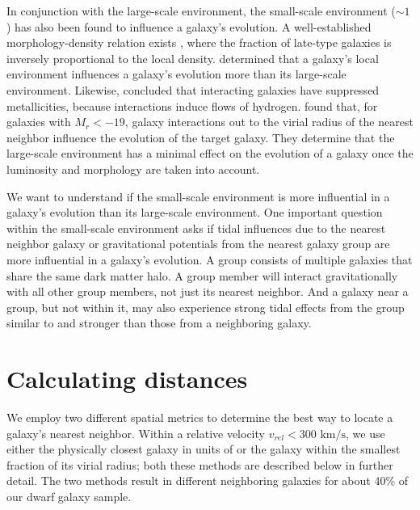In conjunction with the large-scale environment, the small-scale environment 
($\sim 1$ \hMpc) has also been found to influence a galaxy's evolution.  A 
well-established morphology-density relation exists \citep{Dressler80}, where 
the fraction of late-type galaxies is inversely proportional to the local 
density.  \cite{Ellison09} determined that a galaxy's local environment 
influences a galaxy's evolution more than its large-scale environment.  
Likewise, \cite{Rupke08} concluded that interacting galaxies have suppressed 
metallicities, because interactions induce flows of hydrogen.  \cite{Park09} 
found that, for galaxies with $M_r < -19$, galaxy interactions out to the virial 
radius of the nearest neighbor influence the evolution of the target galaxy.  
They determine that the large-scale environment has a minimal effect on the 
evolution of a galaxy once the luminosity and morphology are taken into account.

We want to understand if the small-scale environment is more influential in a 
galaxy's evolution than its large-scale environment.  One important question 
within the small-scale environment asks if tidal influences due to the nearest 
neighbor galaxy or gravitational potentials from the nearest galaxy group are 
more influential in a galaxy's evolution.  A group consists of multiple galaxies 
that share the same dark matter halo.  A group member will interact 
gravitationally with all other group members, not just its nearest neighbor.  
And a galaxy near a group, but not within it, may also experience strong tidal 
effects from the group similar to and stronger than those from a neighboring 
galaxy.





\section[Theory]{Calculating distances}\label{sec:Theory_dist}

We employ two different spatial metrics to determine the best way to locate a 
galaxy's nearest neighbor.  Within a relative velocity 
$v_{rel} < 300\text{ km/s}$, we use either the physically closest galaxy in 
units of \hMpc or the galaxy within the smallest fraction of its virial radius; 
both these methods are described below in further detail.  The two methods 
result in different neighboring galaxies for about 40\% of our dwarf galaxy 
sample.


